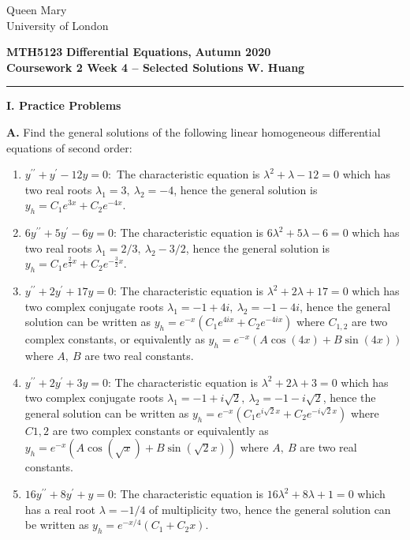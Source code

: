 \documentclass[11pt,a4paper,twoside]{article}
\begin{document}
	\begin{singlespace}
		\begin{center}
			\Huge Queen Mary\\
			\LARGE University of London
		\end{center}
		\Large \textbf{MTH5123} \hfill \Large \textbf{Differential Equations,} \hfill \Large \textbf{Autumn 2020}\\
		\large \textbf{Coursework 2 \- Week 4 – Selected Solutions} \hfill \large \textbf{W. Huang}
		\rule{\textwidth}{0.4pt}
	\end{singlespace}
	\textbf{I. Practice Problems}\par
	\textbf{A.} Find the general solutions of the following linear homogeneous differential equations of second order:
	\begin{enumerate}
		\item $y^{\prime\prime}+y^\prime - 12y=0:$ The characteristic equation is $\lambda^2+\lambda-12=0$ which has two real roots $\lambda_1 = 3,\ \lambda_2 = -4$, hence the general solution is $y_h = C_1e^{3x}+C_2e^{-4x}$.
		\item $6y^{\prime\prime} + 5y^\prime -6y = 0$: The characteristic equation is $6\lambda^2+5\lambda-6=0$ which has two real roots $\lambda_1 = 2/3,\ \lambda_2-3/2$, hence the general solution is $y_h = C_1e^{\frac{2}{3}x}+C_2e^{-\frac{3}{2}x}$.
		\item $y^{\prime\prime} + 2y^\prime+17y=0$: The characteristic equation is $\lambda^2+2\lambda+17=0$ which has two complex conjugate roots $\lambda_1 = -1+4i,\ \lambda_2 = -1-4i$,  hence the general solution can be written as $y_h = e^{-x}(C_1e^{4ix}+C_2e^{-4ix})$ where $C_{1,2}$ are two complex constants, or equivalently as $y_h=e^{-x}(A\cos(4x)+B\sin(4x))$ where $A,\ B$ are two real constants.
		\item $y^{\prime\prime} + 2y^\prime + 3y = 0$: The characteristic equation is $\lambda^2 + 2\lambda + 3 = 0$ which has two complex conjugate roots $\lambda_1 = -1+i\sqrt{2},\ \lambda_2 = -1-i\sqrt{2}$,  hence the general solution can be written as $y_h = e^{-x}\left(C_1e^{i\sqrt{2}x} + C_2e^{-i\sqrt{2}x}\right)$ where $C{1,2}$ are two complex constants or equivalently as $y_h = e^{-x}(A\cos(\sqrt{x}) + B\sin(\sqrt{2}x))$ where $A,\ B$ are two real constants.
		\item $16y^{\prime\prime} + 8y^\prime + y = 0$: The characteristic equation is $16\lambda^2+8\lambda+1=0$ which has a real root $\lambda = −1/4$ of multiplicity two, hence the general solution can be written as $y_h = e^{-x/4}(C_1+C_2x)$.
	\end{enumerate}
\end{document}

